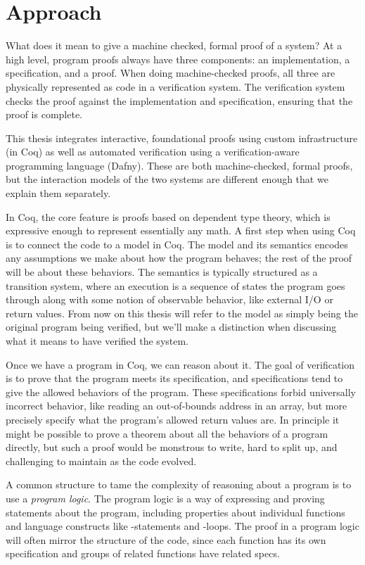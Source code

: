 
\section{Approach}

What does it mean to give a machine checked, formal proof of a system? At a high
level, program proofs always have three components: an implementation, a
specification, and a proof. When doing machine-checked proofs, all three are
physically represented as code in a verification system. The verification system
checks the proof against the implementation and specification, ensuring that the
proof is complete.

This thesis integrates interactive, foundational proofs using custom
infrastructure (in Coq) as well as automated verification using a
verification-aware programming language (Dafny). These are both machine-checked,
formal proofs, but the interaction models of the two systems are different
enough that we explain them separately.

In Coq, the core feature is proofs based on dependent type theory, which is
expressive enough to represent essentially any math. A first step when using Coq
is to connect the code to a model in Coq. The model and its semantics encodes any
assumptions we make about how the program behaves; the rest of the proof will be
about these behaviors. The semantics is typically structured as a transition
system, where an execution is a sequence of states the program goes through
along with some notion of observable behavior, like external I/O or return
values. From now on this thesis will refer to the model as simply being the original
program being verified,
but we'll make a distinction when discussing what it means to have verified
the system.

Once we have a program in Coq, we can reason about it. The goal of
verification is to prove that the program meets its specification, and
specifications tend to give the allowed behaviors of the program. These
specifications forbid universally incorrect behavior, like reading an
out-of-bounds address in an array, but more precisely specify what the program's
allowed return values are. In principle it might be possible to prove a theorem
about all the behaviors of a program directly, but such a proof would be
monstrous to write, hard to split up, and challenging to maintain as the code
evolved.

A common structure to tame the complexity of reasoning about a program is to use
a \emph{program logic}. The program logic is a way of expressing and proving
statements about the program, including properties about individual functions
and language constructs like -statements and -loops. The proof
in a program logic will often mirror the structure of the code, since each
function has its own specification and groups of related functions have related
specs.

